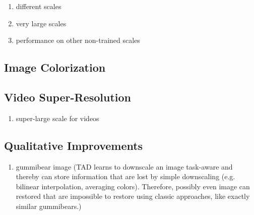 \begin{enumerate}
\item different scales
\item very large scales
\item performance on other non-trained scales
\end{enumerate}

\subsection{Image Colorization}
\label{sec:Experiments_IC}

\subsection{Video Super-Resolution}
\label{sec:Experiments_VSR}

\begin{enumerate}
\item super-large scale for videos
\end{enumerate}

\subsection{Qualitative Improvements}
\label{sec:Experiments_QI}

\begin{enumerate}
\item gummibear image (TAD learns to downscale an image task-aware and thereby
can store information that are lost by simple downscaling (e.g. bilinear
interpolation, averaging colors). Therefore, possibly even image can restored
that are impossible to restore  using classic approaches, like exactly
similar gummibears.)
\end{enumerate}

